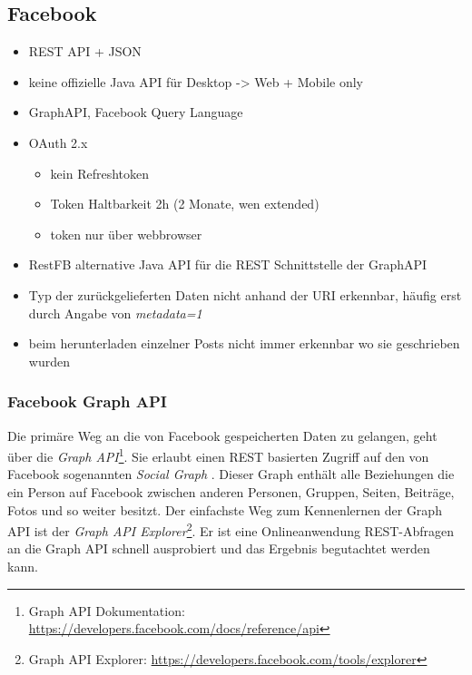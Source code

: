 
\subsection{Facebook} %
\label{sub:facebook_connector}

\begin{itemize}
    \item REST API + JSON
    \item keine offizielle Java API für Desktop -> Web + Mobile only
    \item GraphAPI, Facebook Query Language
    \item OAuth 2.x
    \begin{itemize}
        \item kein Refreshtoken
        \item Token Haltbarkeit 2h (2 Monate, wen extended)
        \item token nur über webbrowser
    \end{itemize}
    \item RestFB alternative Java API für die REST Schnittstelle der GraphAPI
    \item Typ der zurückgelieferten Daten nicht anhand der URI erkennbar, häufig erst durch Angabe von \emph{metadata=1}
    \item beim herunterladen einzelner Posts nicht immer erkennbar wo sie geschrieben wurden
\end{itemize}

\subsubsection{Facebook Graph API} %
\label{ssub:facebook_graph_api}

Die primäre Weg an die von Facebook gespeicherten Daten zu gelangen, geht über die \emph{Graph API}\footnote{Graph API Dokumentation:  \url{https://developers.facebook.com/docs/reference/api}}. Sie erlaubt einen REST basierten Zugriff auf den von Facebook sogenannten \emph{Social Graph} \cite{FacebookGraphAPI}. Dieser Graph enthält alle Beziehungen die ein Person auf Facebook zwischen anderen Personen, Gruppen, Seiten, Beiträge, Fotos und so weiter besitzt. Der einfachste Weg zum Kennenlernen der Graph API ist der \emph{Graph API Explorer}\footnote{Graph API Explorer: \url{https://developers.facebook.com/tools/explorer}}. Er ist eine Onlineanwendung REST-Abfragen an die Graph API schnell ausprobiert und das Ergebnis begutachtet werden kann.

